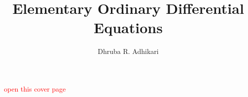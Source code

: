 \documentclass[pagenumber]{book}
\title{Elementary Ordinary Differential Equations}
\author{Dhruba R. Adhikari}
\newcommand{\booksubtitle}{Methods and Applications}
\numberwithin{section}{chapter}
\numberwithin{equation}{chapter}
\theoremstyle{definition}
\begin{document}
\frontmatter

\begin{titlepage}
%
%
%
%
%
%
%
%
%
%


\textcolor{red}{open this cover page}

%



\end{titlepage}
\restoregeometry

\newpage
\nopagecolor
\thispagestyle{empty}
\end{document}
